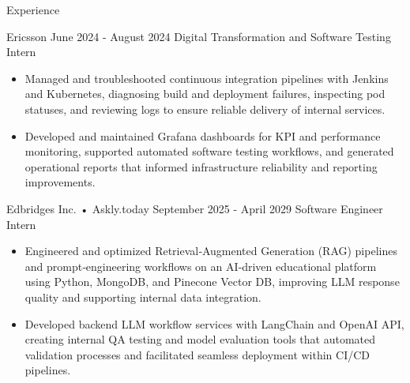 \documentclass{resume}
\newcommand{\tagged}[2]{\hypertarget{#1}{#2}}
\begin{document}
\begin{rSection}{Experience}
\begin{rSubsection}
  {\tagged{950b16f0_company}{Ericsson}}
  {\small \tagged{950b16f0_date}{June 2024 - August 2024}}
  {\tagged{950b16f0_title}{Digital Transformation and Software Testing Intern}}
  {\textit{\tagged{950b16f0_location}{}}}
{\fontsize{10}{12}\selectfont
\begin{itemize}
  \itemsep -0.5em

  \item \tagged{experience_950b16f0_b1}{Managed and troubleshooted continuous integration pipelines with Jenkins and Kubernetes, diagnosing build and deployment failures, inspecting pod statuses, and reviewing logs to ensure reliable delivery of internal services.}

  \item \tagged{experience_950b16f0_b2}{Developed and maintained Grafana dashboards for KPI and performance monitoring, supported automated software testing workflows, and generated operational reports that informed infrastructure reliability and reporting improvements.}

\end{itemize}
}
\end{rSubsection}
\vspace{-3mm}

\begin{rSubsection}
  {\tagged{0bf9341c_company}{Edbridges Inc. • Askly.today}}
  {\small \tagged{0bf9341c_date}{September 2025 - April 2029}}
  {\tagged{0bf9341c_title}{Software Engineer Intern}}
  {\textit{\tagged{0bf9341c_location}{}}}
{\fontsize{10}{12}\selectfont
\begin{itemize}
  \itemsep -0.5em

  \item \tagged{experience_0bf9341c_b1}{Engineered and optimized Retrieval‑Augmented Generation (RAG) pipelines and prompt‑engineering workflows on an AI‑driven educational platform using Python, MongoDB, and Pinecone Vector DB, improving LLM response quality and supporting internal data integration.}

  \item \tagged{experience_0bf9341c_b2}{Developed backend LLM workflow services with LangChain and OpenAI API, creating internal QA testing and model evaluation tools that automated validation processes and facilitated seamless deployment within CI/CD pipelines.}

\end{itemize}
}
\end{rSubsection}
\vspace{-3mm}

\end{rSection}
\end{document}
